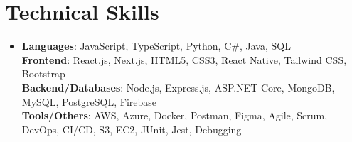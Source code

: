 \documentclass[letterpaper,11pt]{article}
\begin{document}
\section{Technical Skills}
\begin{itemize}[leftmargin=0.15in, label={}]
\item{
\textbf{Languages}{: JavaScript, TypeScript, Python, C\#, Java, SQL} \\
\textbf{Frontend}{: React.js, Next.js, HTML5, CSS3, React Native, Tailwind CSS, Bootstrap} \\
\textbf{Backend/Databases}{: Node.js, Express.js, ASP.NET Core, MongoDB, MySQL, PostgreSQL, Firebase} \\
\textbf{Tools/Others}{: AWS, Azure, Docker, Postman, Figma, Agile, Scrum, DevOps, CI/CD, S3, EC2, JUnit, Jest, Debugging}
} \\
\end{itemize}
\end{document}
